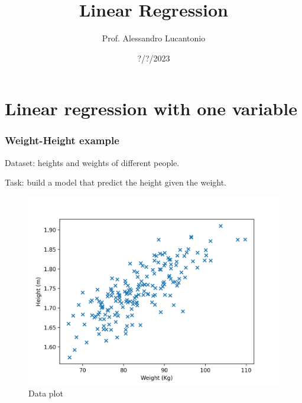 \documentclass{beamer}
\title{Linear Regression}
\author{Prof. Alessandro Lucantonio}
\institute{Aarhus University - Department of Mechanical and Production Engineering}
\date{?/?/2023}
\begin{document}
	
	\frame{\titlepage}
	
	\section{Linear regression with one variable}

	\begin{frame}
		\frametitle{Weight-Height example}
		Dataset: heights and weights of different people.
		
		Task: build a model that predict the height given the weight. 
		
		\begin{figure}
			\centering
			\includegraphics[scale=0.5]{images/linear_regression_data}
			\caption{Data plot}
		\end{figure}
	\end{frame}
\end{document}
